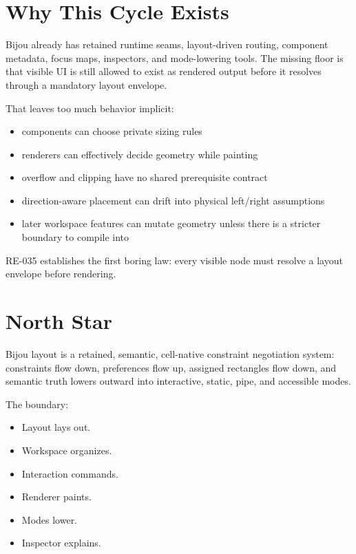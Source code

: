 \section{Why This Cycle Exists}\label{record-163-why-this-cycle-exists}

Bijou already has retained runtime seams, layout-driven routing, component metadata, focus maps, inspectors, and mode-lowering tools. The missing floor is that visible UI is still allowed to exist as rendered output before it resolves through a mandatory layout envelope.

That leaves too much behavior implicit:

\begin{itemize}
\tightlist
\item
  components can choose private sizing rules
\item
  renderers can effectively decide geometry while painting
\item
  overflow and clipping have no shared prerequisite contract
\item
  direction-aware placement can drift into physical left/right assumptions
\item
  later workspace features can mutate geometry unless there is a stricter boundary to compile into
\end{itemize}

RE-035 establishes the first boring law: every visible node must resolve a layout envelope before rendering.

\section{North Star}\label{record-163-north-star}

Bijou layout is a retained, semantic, cell-native constraint negotiation system: constraints flow down, preferences flow up, assigned rectangles flow down, and semantic truth lowers outward into interactive, static, pipe, and accessible modes.

The boundary:

\begin{itemize}
\tightlist
\item
  Layout lays out.
\item
  Workspace organizes.
\item
  Interaction commands.
\item
  Renderer paints.
\item
  Modes lower.
\item
  Inspector explains.
\end{itemize}

